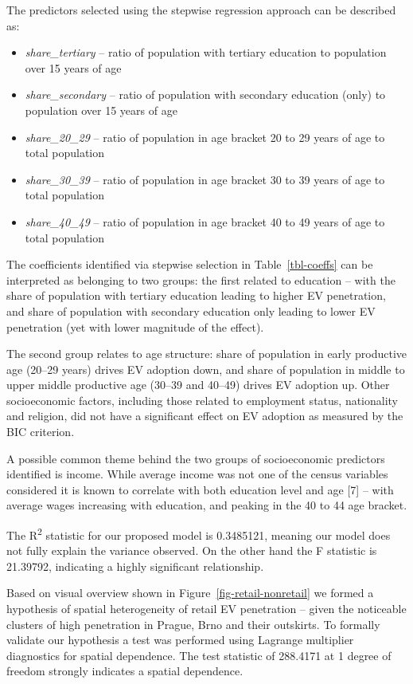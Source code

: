 \documentclass{mmeproc}
\begin{document}
The predictors selected using the stepwise regression approach can be
described as:

\begin{itemize}
\item
  \emph{share\_tertiary} -- ratio of population with tertiary education
  to population over 15 years of age
\item
  \emph{share\_secondary} -- ratio of population with secondary
  education (only) to population over 15 years of age
\item
  \emph{share\_20\_29} -- ratio of population in age bracket 20 to 29
  years of age to total population
\item
  \emph{share\_30\_39} -- ratio of population in age bracket 30 to 39
  years of age to total population
\item
  \emph{share\_40\_49} -- ratio of population in age bracket 40 to 49
  years of age to total population
\end{itemize}

The coefficients identified via stepwise selection in
Table~\ref{tbl-coeffs} can be interpreted as belonging to two groups:
the first related to education -- with the share of population with
tertiary education leading to higher EV penetration, and share of
population with secondary education only leading to lower EV penetration
(yet with lower magnitude of the effect).

The second group relates to age structure: share of population in early
productive age (20--29 years) drives EV adoption down, and share of
population in middle to upper middle productive age (30--39 and 40--49)
drives EV adoption up. Other socioeconomic factors, including those
related to employment status, nationality and religion, did not have a
significant effect on EV adoption as measured by the BIC criterion.

A possible common theme behind the two groups of socioeconomic
predictors identified is income. While average income was not one of the
census variables considered it is known to correlate with both education
level and age {[}7{]} -- with average wages increasing with education,
and peaking in the 40 to 44 age bracket.

The R\textsuperscript{2} statistic for our proposed model is 0.3485121,
meaning our model does not fully explain the variance observed. On the
other hand the F statistic is 21.39792, indicating a highly significant
relationship.

Based on visual overview shown in Figure~\ref{fig-retail-nonretail} we
formed a hypothesis of spatial heterogeneity of retail EV penetration --
given the noticeable clusters of high penetration in Prague, Brno and
their outskirts. To formally validate our hypothesis a test was
performed using Lagrange multiplier diagnostics for spatial dependence.
The test statistic of 288.4171 at 1 degree of freedom strongly indicates
a spatial dependence.
\end{document}
